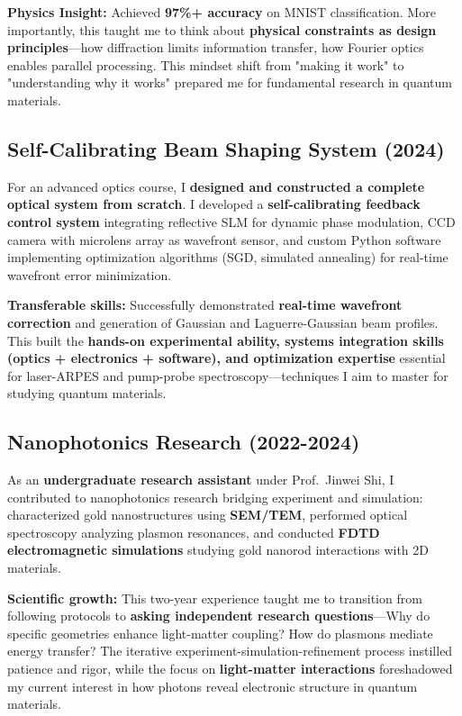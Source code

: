 \documentclass[11pt,a4paper]{article}
\begin{document}
\textbf{Physics Insight:} Achieved \textbf{97\%+ accuracy} on MNIST classification. More importantly, this taught me to think about \textbf{physical constraints as design principles}—how diffraction limits information transfer, how Fourier optics enables parallel processing. This mindset shift from "making it work" to "understanding why it works" prepared me for fundamental research in quantum materials.

\subsection{Self-Calibrating Beam Shaping System (2024)}

For an advanced optics course, I \textbf{designed and constructed a complete optical system from scratch}. I developed a \textbf{self-calibrating feedback control system} integrating reflective SLM for dynamic phase modulation, CCD camera with microlens array as wavefront sensor, and custom Python software implementing optimization algorithms (SGD, simulated annealing) for real-time wavefront error minimization.

\textbf{Transferable skills:} Successfully demonstrated \textbf{real-time wavefront correction} and generation of Gaussian and Laguerre-Gaussian beam profiles. This built the \textbf{hands-on experimental ability, systems integration skills (optics + electronics + software), and optimization expertise} essential for laser-ARPES and pump-probe spectroscopy—techniques I aim to master for studying quantum materials.

\subsection{Nanophotonics Research (2022-2024)}

As an \textbf{undergraduate research assistant} under Prof.~Jinwei Shi, I contributed to nanophotonics research bridging experiment and simulation: characterized gold nanostructures using \textbf{SEM/TEM}, performed optical spectroscopy analyzing plasmon resonances, and conducted \textbf{FDTD electromagnetic simulations} studying gold nanorod interactions with 2D materials.

\textbf{Scientific growth:} This two-year experience taught me to transition from following protocols to \textbf{asking independent research questions}—Why do specific geometries enhance light-matter coupling? How do plasmons mediate energy transfer? The iterative experiment-simulation-refinement process instilled patience and rigor, while the focus on \textbf{light-matter interactions} foreshadowed my current interest in how photons reveal electronic structure in quantum materials.
\end{document}
